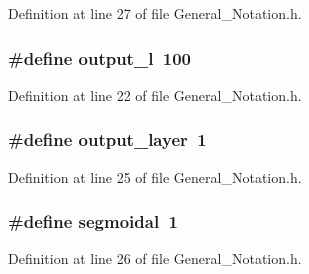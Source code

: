 Definition at line 27 of file General\-\_\-\-Notation.\-h.

\hypertarget{a00008_a0a0ddfc9fb3bc3d90d175ed1f7bd54c5}{
\subsubsection[{output\-\_\-l}]{\setlength{\rightskip}{0pt plus 5cm}\#define output\-\_\-l~100}}\label{d4/dee/a00008_a0a0ddfc9fb3bc3d90d175ed1f7bd54c5}


Definition at line 22 of file General\-\_\-\-Notation.\-h.

\hypertarget{a00008_a64e47a8f29d1c6cc62edf670a753accc}{
\subsubsection[{output\-\_\-layer}]{\setlength{\rightskip}{0pt plus 5cm}\#define output\-\_\-layer~1}}\label{d4/dee/a00008_a64e47a8f29d1c6cc62edf670a753accc}


Definition at line 25 of file General\-\_\-\-Notation.\-h.

\hypertarget{a00008_a2f65cc4d2a528ee38224d709c1d73015}{
\subsubsection[{segmoidal}]{\setlength{\rightskip}{0pt plus 5cm}\#define segmoidal~1}}\label{d4/dee/a00008_a2f65cc4d2a528ee38224d709c1d73015}


Definition at line 26 of file General\-\_\-\-Notation.\-h.

